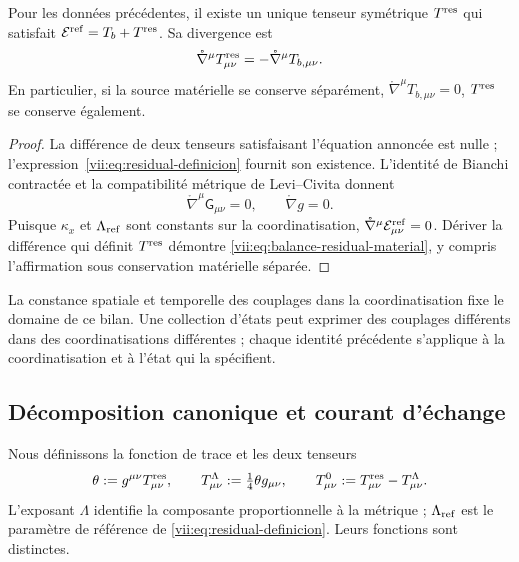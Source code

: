 \begin{theorem}
\label{vii:thm:residual-unicidad-balance}
Pour les données précédentes, il existe un unique tenseur symétrique \(T^{\rm res}\) qui satisfait \(\mathcal E^{\rm ref}=T_b+T^{\rm res}\). Sa divergence est
\begin{equation}
 \mathring\nabla^\mu T^{\rm res}_{\mu\nu}
 =-\mathring\nabla^\mu T_{b,\mu\nu}.
 \label{vii:eq:balance-residual-material}
\end{equation}
En particulier, si la source matérielle se conserve séparément,
\(\mathring\nabla^\mu T_{b,\mu\nu}=0\), \(T^{\rm res}\)
se conserve également.
\end{theorem}
\begin{proof}
La différence de deux tenseurs satisfaisant l'équation annoncée est nulle ; l'expression~\eqref{vii:eq:residual-definicion} fournit son existence. L'identité de Bianchi contractée et la compatibilité métrique de Levi--Civita donnent
\[
 \mathring\nabla^\mu\mathsf G_{\mu\nu}=0,
 \qquad \mathring\nabla g=0.
\]
Puisque \(\kappa_x\) et \(\Lambda_{\rm ref}\) sont constants sur la coordinatisation, \(\mathring\nabla^\mu\mathcal E^{\rm ref}_{\mu\nu}=0\). Dériver la différence qui définit \(T^{\rm res}\) démontre \eqref{vii:eq:balance-residual-material}, y compris l'affirmation sous conservation matérielle séparée.
\end{proof}

La constance spatiale et temporelle des couplages dans la coordinatisation fixe le domaine de ce bilan. Une collection d'états peut exprimer des couplages différents dans des coordinatisations différentes ; chaque identité précédente s'applique à la coordinatisation et à l'état qui la spécifient.

\subsection{Décomposition canonique et courant d'échange}
\label{vii:subsec:traza-corriente-residual}

Nous définissons la fonction de trace et les deux tenseurs
\begin{equation}
 \theta:=g^{\mu\nu}T^{\rm res}_{\mu\nu},\qquad
 T^{\Lambda}_{\mu\nu}:=\tfrac14\theta g_{\mu\nu},\qquad
 T^{0}_{\mu\nu}:=T^{\rm res}_{\mu\nu}-T^{\Lambda}_{\mu\nu}.
 \label{vii:eq:descomposicion-traza-residual}
\end{equation}
L'exposant \(\Lambda\) identifie la composante proportionnelle à la
métrique ; \(\Lambda_{\rm ref}\) est le paramètre de référence de
\eqref{vii:eq:residual-definicion}. Leurs fonctions sont distinctes.

